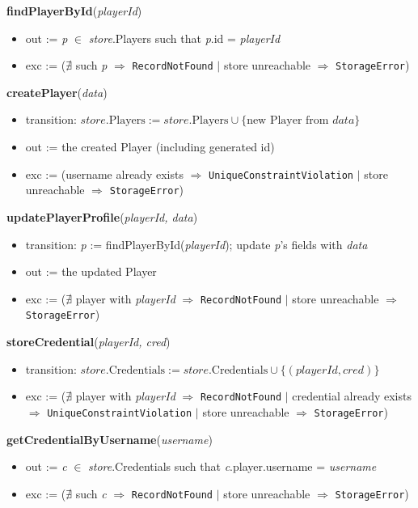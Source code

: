 \documentclass[12pt, titlepage]{article}
\begin{document}
\noindent\textbf{findPlayerById}(\textit{playerId})
\begin{itemize}
    \item out := \textit{p} $\in$ \textit{store}.Players such that \textit{p}.id = \textit{playerId}
    \item exc := ($\nexists$ such \textit{p} $\Rightarrow$ \texttt{RecordNotFound} $|$ store unreachable $\Rightarrow$ \texttt{StorageError})
\end{itemize}

\noindent\textbf{createPlayer}(\textit{data})
\begin{itemize}
    \item transition: $\textit{store}.\text{Players} := \textit{store}.\text{Players} \cup \{\text{new Player from } \textit{data}\}$
    \item out := the created Player (including generated id)
    \item exc := (username already exists $\Rightarrow$ \texttt{UniqueConstraintViolation} $|$ store unreachable $\Rightarrow$ \texttt{StorageError})
\end{itemize}

\noindent\textbf{updatePlayerProfile}(\textit{playerId, data})
\begin{itemize}
    \item transition: \textit{p} := findPlayerById(\textit{playerId}); update \textit{p}'s fields with \textit{data}
    \item out := the updated Player
    \item exc := ($\nexists$ player with \textit{playerId} $\Rightarrow$ \texttt{RecordNotFound} $|$ store unreachable $\Rightarrow$ \texttt{StorageError})
\end{itemize}

\noindent\textbf{storeCredential}(\textit{playerId, cred})
\begin{itemize}
    \item transition: $\textit{store}.\text{Credentials} := \textit{store}.\text{Credentials} \cup \{(\textit{playerId}, \textit{cred})\}$
    \item exc := ($\nexists$ player with \textit{playerId} $\Rightarrow$ \texttt{RecordNotFound} $|$ credential already exists $\Rightarrow$ \texttt{UniqueConstraintViolation} $|$ store unreachable $\Rightarrow$ \texttt{StorageError})
\end{itemize}

\noindent\textbf{getCredentialByUsername}(\textit{username})
\begin{itemize}
    \item out := \textit{c} $\in$ \textit{store}.Credentials such that \textit{c}.player.username = \textit{username}
    \item exc := ($\nexists$ such \textit{c} $\Rightarrow$ \texttt{RecordNotFound} $|$ store unreachable $\Rightarrow$ \texttt{StorageError})
\end{itemize}
\end{document}
